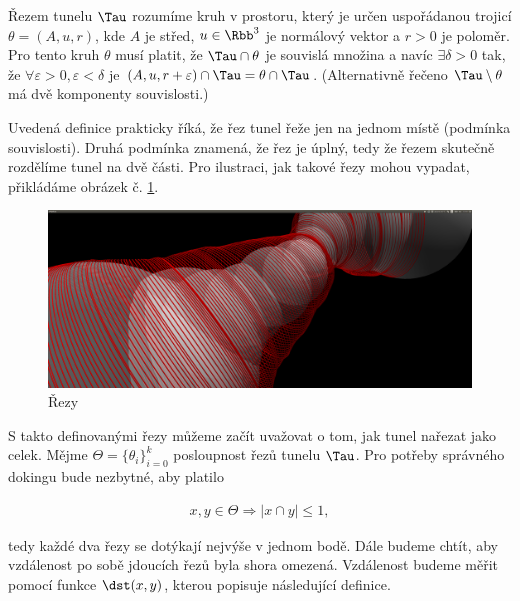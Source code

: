 \begin{defi}
Řezem tunelu $ \Tau $ rozumíme kruh v prostoru, který je určen uspořádanou trojicí
$\theta = (A, u, r)$, kde $ A $ je střed, $ u \in \Rbb^3 $ je normálový vektor a $ r > 0 $ je poloměr.
Pro tento kruh $ \theta $ musí platit, že $ \Tau \cap \theta $ je souvislá množina a navíc
$ \exists \delta > 0 $ tak, že $ \forall \varepsilon > 0,  \varepsilon < \delta $ je
$ (A, u, r + \varepsilon) \cap \Tau = \theta \cap \Tau $.
(Alternativně řečeno $\Tau \setminus \theta $ má dvě komponenty souvislosti.)
\end{defi}

Uvedená definice prakticky říká, že řez tunel řeže jen na jednom místě (podmínka souvislosti).
Druhá podmínka znamená, že řez je úplný, tedy že řezem skutečně rozdělíme tunel na dvě části.
Pro ilustraci, jak takové řezy mohou vypadat, přikládáme obrázek č. \ref{fig:tunnel_cuts}.
\begin{figure}[ht]
    \centering
    \includegraphics[width=\textwidth]{img/simple_cuts.png}
    \caption{Řezy}
  \centering
  \label{fig:tunnel_cuts}
\end{figure}

S takto definovanými řezy můžeme začít uvažovat o tom, jak tunel nařezat jako celek.
Mějme $ \Theta = \{\theta_i\}_{i=0}^{k}$ posloupnost řezů tunelu $ \Tau $. Pro potřeby správného
dokingu bude nezbytné, aby platilo

\begin{align}
x, y \in \Theta \Rightarrow |x \cap y| \leq 1, \label{cond:not_intersecting}
\end{align}

tedy každé dva řezy se dotýkají nejvýše v jednom bodě. Dále budeme chtít, aby vzdálenost
po sobě jdoucích řezů byla shora omezená. Vzdálenost budeme měřit pomocí funkce
$ \dst(x, y) $, kterou popisuje následující definice.

